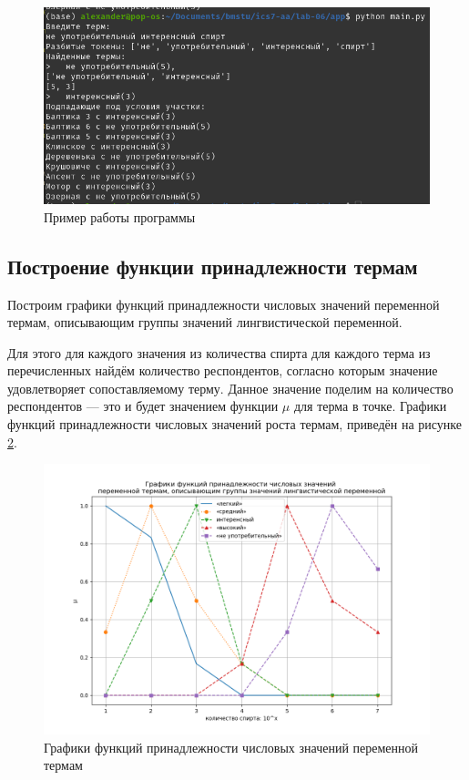 \begin{figure}[ht!]
	\begin{center}
		\captionsetup{singlelinecheck = false, justification=centerfirst}
		\includegraphics[scale=0.6]{assets/demon.png}
		\caption{Пример работы программы}
		\label{demonstration}
	\end{center}
	
	
\end{figure}

\newpage


\subsection{Построение функции принадлежности термам}

Построим графики функций принадлежности числовых значений переменной термам, описывающим группы значений лингвистической переменной.

Для этого для каждого значения из количества спирта для каждого терма из перечисленных найдём количество респондентов, согласно которым значение удовлетворяет сопоставляемому терму.
Данное значение поделим на количество респондентов --- это и будет значением функции $\mu$ для терма в точке.
Графики функций принадлежности числовых значений роста термам, приведён на рисунке \ref{img:fig1}.

\begin{figure}[ht!]
	\begin{center}
		\captionsetup{singlelinecheck = false, justification=centerfirst}
		\includegraphics[scale=0.6]{assets/graphs/Figure_1.png}
		\caption{Графики функций принадлежности числовых значений переменной термам}
		\label{img:fig1}
	\end{center}
	
	
\end{figure}